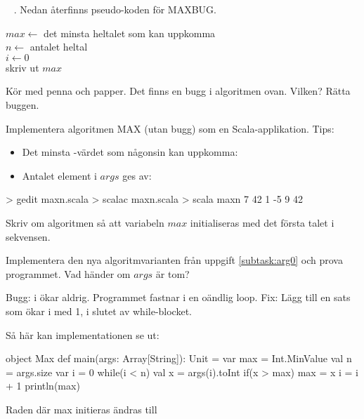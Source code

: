 \QUESTBEGIN

\Task  \what~ . Nedan återfinns pseudo-koden för MAXBUG.

\begin{algorithm}[H]

 $max \leftarrow$ det minsta heltalet som kan uppkomma  \\
 $n \leftarrow $ antalet heltal \\
 $i \leftarrow 0$ \\
 skriv ut $max$
\end{algorithm}

\Subtask\Pen Kör med penna och papper. Det finns en bugg i algoritmen ovan. Vilken? Rätta buggen.

\Subtask Implementera algoritmen MAX (utan bugg) som en Scala-applikation. Tips:
\begin{itemize}[noitemsep, nolistsep]
\item Det minsta -värdet som någonsin kan uppkomma: 
\item Antalet element i $args$ ges av: 
\end{itemize}

\begin{REPL}
> gedit maxn.scala
> scalac maxn.scala
> scala maxn 7 42 1 -5 9
42
\end{REPL}

\Subtask\Pen \label{subtask:arg0} Skriv om algoritmen så att variabeln $max$ initialiseras med det första talet i sekvensen.

\Subtask Implementera den nya algoritmvarianten från uppgift \ref{subtask:arg0} och prova programmet. Vad händer om $args$ är tom?

\SOLUTION


\TaskSolved \what


\SubtaskSolved  Bugg: i ökar aldrig. Programmet fastnar i en oändlig loop. Fix: Lägg till en sats som ökar i med 1, i slutet av while-blocket.

\SubtaskSolved  Så här kan implementationen se ut:
\begin{Code}
object Max {
  def main(args: Array[String]): Unit = {
    var max = Int.MinValue
    val n = args.size
    var i = 0
    while(i < n) {
      val x = args(i).toInt
      if(x > max) {
        max = x
      }
      i = i + 1
    }
    println(max)
  }
}
\end{Code}
\SubtaskSolved  Raden där max initieras ändras till 

